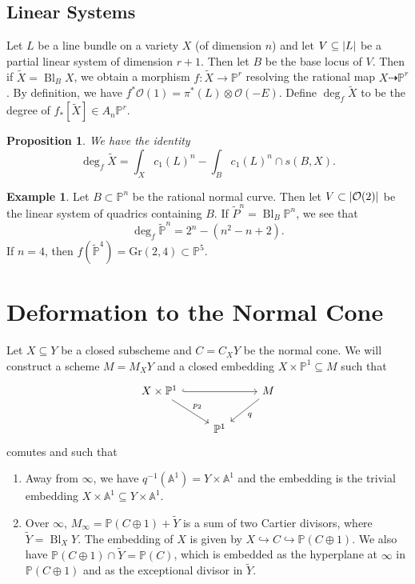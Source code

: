 \documentclass[leqno, openany]{memoir}
\newtheorem{prop}[thm]{Proposition}
\theoremstyle{definition}
\newtheorem{exm}[thm]{Example}
\theoremstyle{remark}
\theoremstyle{plain}
\theoremstyle{definition}
\theoremstyle{remark}
\newcommand{\A}{\mathbb{A}}
\renewcommand{\P}{\mathbb{P}}
\newcommand{\mc}[1]{\mathcal{#1}}
\newcommand{\mr}[1]{\mathrm{#1}}
\newcommand{\wt}[1]{\widetilde{#1}}
\DeclareMathOperator{\Bl}{Bl}
\begin{document}
\subsection{Linear Systems}%

Let $L$ be a line bundle on a variety $X$ (of dimension $n$) and let $V
\subseteq \abs{L}$ be a partial linear system of dimension $r+1$. Then let $B$
be the base locus of $V$. Then if $\wt{X} = \Bl_B X$, we obtain a morphism $f
\colon \wt{X} \to \P^r$ resolving the rational map $X \dashrightarrow \P^r$. By
definition, we have $f^* \mc{O}(1) = \pi^*(L) \otimes \mc{O}(-E)$. Define
$\deg_f \wt{X}$ to be the degree of $f_* [\wt{X}] \in A_n \P^r$.

\begin{prop} We have the identity \[ \deg_f \wt{X} = \int_X {c_1(L)}^n - \int_B
{c_1(L)}^n \cap s(B,X). \] \end{prop}

\begin{exm} Let $B \subset \P^n$ be the rational normal curve. Then let $V
    \subset \abs{\mc{O}(2)}$ be the linear system of quadrics containing $B$.
    If $\wt{P}^n = \Bl_B \P^n$, we see that \[ \deg_f \wt{\P}^n = 2^n -
    (n^2-n+2). \] If $n = 4$, then $f(\wt{\P}^4) = \mr{Gr}(2,4) \subset \P^5$.
\end{exm}

\section{Deformation to the Normal Cone}%
\label{sec:deformation_to_the_normal_cone}

Let $X \subseteq Y$ be a closed subscheme and $C = C_X Y$ be the normal cone.
We will construct a scheme $M = M_X Y$ and a closed embedding $X \times \P^1
\subseteq M$ such that \begin{equation*} \begin{tikzcd} X \times \P^1
    \ar[hookrightarrow]{rr} \ar{dr}{p_2} & & M \ar{dl}{q} \\ & \P^1
    \end{tikzcd} \end{equation*} comutes and such that \begin{enumerate} \item
    Away from $\infty$, we have $q^{-1}(\A^1) = Y \times \A^1$ and the
    embedding is the trivial embedding $X \times \A^1 \subseteq Y \times \A^1$.
\item Over $\infty$, $M_{\infty} = \P(C \oplus 1) + \wt{Y}$ is a sum of two
    Cartier divisors, where $\wt{Y} = \Bl_X Y$. The embedding of $X$ is given
    by $X \hookrightarrow C \hookrightarrow \P(C \oplus 1)$. We also have $\P(C
    \oplus 1) \cap \wt{Y} = \P(C)$, which is embedded as the hyperplane at
    $\infty$ in $\P(C \oplus 1)$ and as the exceptional divisor in $\wt{Y}$.
    \end{enumerate}
\end{document}
